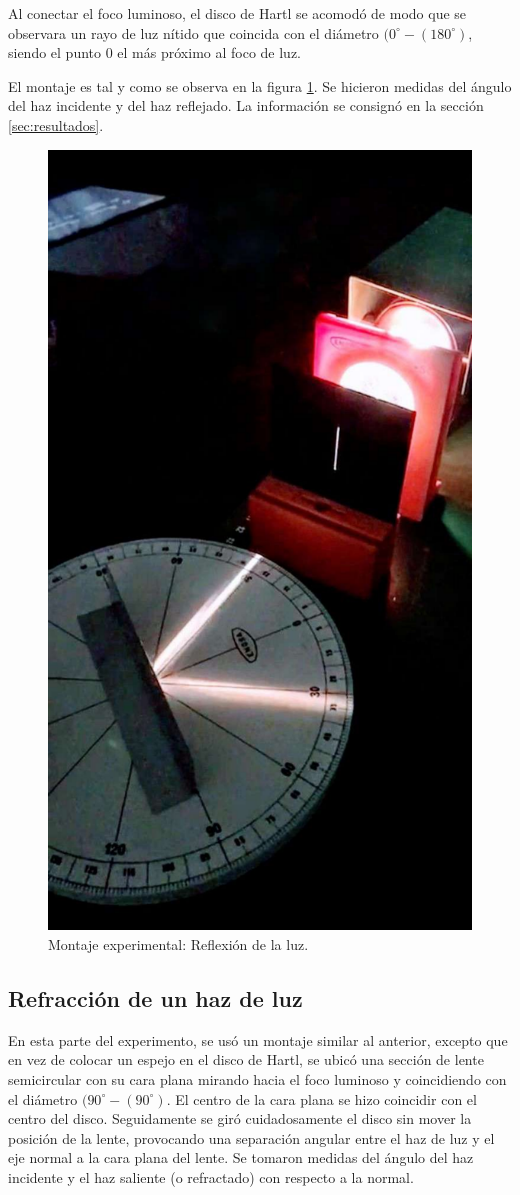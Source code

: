 \documentclass[
aps,
reprint,
amsmath, amssymb,
superscriptaddress,
]{revtex4-2}
\begin{document}
Al conectar el foco luminoso, el disco de Hartl se acomodó de modo que se observara un rayo de luz nítido que coincida con el diámetro $(0^{\circ}-(180^{\circ})$, siendo el punto 0 el más próximo al foco de luz.

El montaje es tal y como se observa en la figura \ref{fig:img_0}. Se hicieron medidas del ángulo del haz incidente y del haz reflejado. La información se consignó en la sección \ref{sec:resultados}.

\begin{figure}
\centering
\includegraphics[width=0.5\columnwidth]{img/img0.pdf}
\caption{\label{fig:img_0} Montaje experimental: Reflexión de la luz.}
\end{figure}

\subsection{Refracción de un haz de luz}
En esta parte del experimento, se usó un montaje similar al anterior, excepto que en vez de colocar un espejo en el disco de Hartl, se ubicó una sección de lente semicircular con su cara plana mirando hacia el foco luminoso y coincidiendo con el diámetro $(90^{\circ}-(90^{\circ})$. El centro de la cara plana se hizo coincidir con el centro del disco. Seguidamente se giró cuidadosamente el disco sin mover la posición de la lente, provocando una separación angular entre el haz de luz y el eje normal a la cara plana del lente.
Se tomaron medidas del ángulo del haz incidente y el haz saliente (o refractado) con respecto a la normal.
\end{document}
